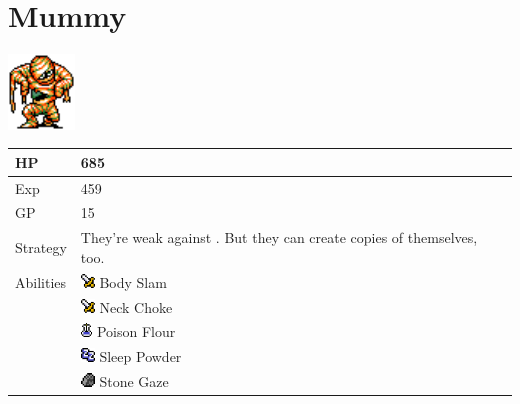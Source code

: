 \section{Mummy}
\label{monster:mummy}

\includegraphics[height=2cm,keepaspectratio]{./resources/monster/mummy}

\begin{longtable}{ l p{9cm} }
	HP
	& 685
\\ \hline
	Exp
	& 459
\\ \hline
	GP
	& 15
\\ \hline
	Strategy
	& They're weak against \nameref{spell:cure}. But they can create copies of themselves, too.
\\ \hline
	Abilities
	& \includegraphics[height=1em,keepaspectratio]{./resources/effects/damage} Body Slam \\
	& \includegraphics[height=1em,keepaspectratio]{./resources/effects/damage} Neck Choke \\
	& \includegraphics[height=1em,keepaspectratio]{./resources/effects/poison} Poison Flour \\
	& \includegraphics[height=1em,keepaspectratio]{./resources/effects/sleep} Sleep Powder \\
	& \includegraphics[height=1em,keepaspectratio]{./resources/effects/petrify} Stone Gaze
\end{longtable}
